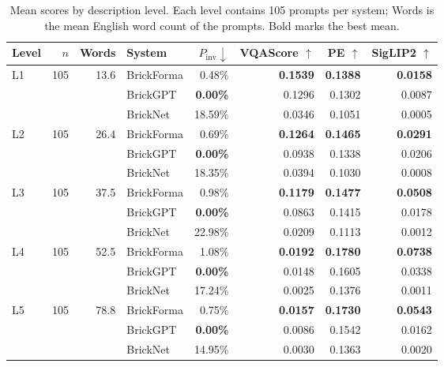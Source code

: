 \begin{table}[t]
\centering\small
\setlength{\tabcolsep}{3pt}
\begin{tabular}{lrrlrrrr}
\toprule
Level & $n$ & Words & System & $P_{\mathrm{inv}}\downarrow$ & VQAScore $\uparrow$ & PE $\uparrow$ & SigLIP2 $\uparrow$ \\
\midrule
L1 & 105 & 13.6 & BrickForma & 0.48\% & \textbf{0.1539} & \textbf{0.1388} & \textbf{0.0158} \\
 &  &  & BrickGPT & \textbf{0.00\%} & 0.1296 & 0.1302 & 0.0087 \\
 &  &  & BrickNet & 18.59\% & 0.0346 & 0.1051 & 0.0005 \\
\midrule
L2 & 105 & 26.4 & BrickForma & 0.69\% & \textbf{0.1264} & \textbf{0.1465} & \textbf{0.0291} \\
 &  &  & BrickGPT & \textbf{0.00\%} & 0.0938 & 0.1338 & 0.0206 \\
 &  &  & BrickNet & 18.35\% & 0.0394 & 0.1030 & 0.0008 \\
\midrule
L3 & 105 & 37.5 & BrickForma & 0.98\% & \textbf{0.1179} & \textbf{0.1477} & \textbf{0.0508} \\
 &  &  & BrickGPT & \textbf{0.00\%} & 0.0863 & 0.1415 & 0.0178 \\
 &  &  & BrickNet & 22.98\% & 0.0209 & 0.1113 & 0.0012 \\
\midrule
L4 & 105 & 52.5 & BrickForma & 1.08\% & \textbf{0.0192} & \textbf{0.1780} & \textbf{0.0738} \\
 &  &  & BrickGPT & \textbf{0.00\%} & 0.0148 & 0.1605 & 0.0338 \\
 &  &  & BrickNet & 17.24\% & 0.0025 & 0.1376 & 0.0011 \\
\midrule
L5 & 105 & 78.8 & BrickForma & 0.75\% & \textbf{0.0157} & \textbf{0.1730} & \textbf{0.0543} \\
 &  &  & BrickGPT & \textbf{0.00\%} & 0.0086 & 0.1542 & 0.0162 \\
 &  &  & BrickNet & 14.95\% & 0.0030 & 0.1363 & 0.0020 \\
\bottomrule
\end{tabular}
\caption{Mean scores by description level. Each level contains 105 prompts per system; Words is the mean English word count of the prompts. Bold marks the best mean.}
\label{tab:level-results}
\end{table}
